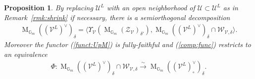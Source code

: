 \documentclass [11pt,oneside,a4paper,mathscr]{amsart}
\newtheorem{prop}[thm]{Proposition}
\theoremstyle{definition}
\newcommand{\zZ}{\mathcal{Z}}
\newcommand{\U}{\mathcal{U}}
\newcommand{\V}{\mathcal{V}}
\newcommand{\MM}{\operatorname{M}}
\begin{document}
\begin{prop}\label{prop:sod:V}
By replacing $\U^L$ with an open neighborhood of $\U \subset \U^L$ as in Remark~\ref{rmk:shrink} if necessary, 
there is a semiorthogonal decomposition 
\begin{align}\label{sod:V}
\MM_{\mathbb{G}_m}((\V^L)^{\vee})_{\delta}=\langle \Upsilon_{\V} (\MM_{\mathbb{G}_m}(\zZ_{\V})_{\delta'}), \MM_{\mathbb{G}_m}((\V^L)^{\vee})_{\delta} \cap 
\mathcal{W}_{\V, \delta}\rangle. 
\end{align}
Moreover the functor (\ref{funct:UpM}) is fully-faithful and 
(\ref{comp:func}) restricts to an equivalence 
\begin{align}\label{eq:QBV}
\Phi \colon 
\MM_{\mathbb{G}_m}((\V^L)^{\vee})_{\delta} \cap \mathcal{W}_{\V, \delta} \stackrel{\sim}{\to}
\MM_{\mathbb{G}_m}((\V^L)^{\vee}_{\circ})_{\delta}.     
\end{align}
    \end{prop}
\end{document}
